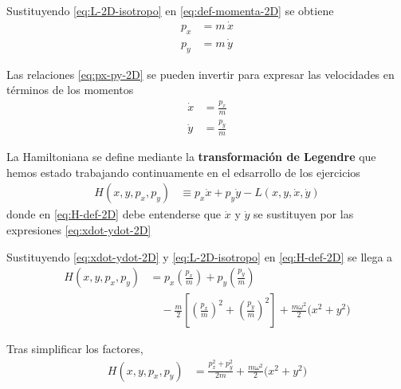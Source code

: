 \documentclass{article}
\begin{document}
Sustituyendo \eqref{eq:L-2D-isotropo} en \eqref{eq:def-momenta-2D} se obtiene
\begin{equation}
\begin{split}
p_{x} &= m\,\dot{x} \\[4pt]
p_{y} &= m\,\dot{y}
\end{split}
\label{eq:px-py-2D}
\end{equation}

Las relaciones \eqref{eq:px-py-2D} se pueden invertir para expresar las
velocidades en términos de los momentos
\begin{equation}
\begin{split}
\dot{x} &= \frac{p_{x}}{m} \\[4pt]
\dot{y} &= \frac{p_{y}}{m}
\end{split}
\label{eq:xdot-ydot-2D}
\end{equation}

La Hamiltoniana se define mediante la \textbf{transformación de Legendre} que hemos estado trabajando continuamente en el edsarrollo de los ejercicios
\begin{equation}
\begin{split}
H(x,y,p_{x},p_{y})
&\equiv p_{x}\dot{x} + p_{y}\dot{y} - L(x,y,\dot{x},\dot{y})
\end{split}
\label{eq:H-def-2D}
\end{equation}
donde en \eqref{eq:H-def-2D} debe entenderse que $\dot{x}$ y $\dot{y}$ se
sustituyen por las expresiones \eqref{eq:xdot-ydot-2D}

Sustituyendo \eqref{eq:xdot-ydot-2D} y \eqref{eq:L-2D-isotropo} en
\eqref{eq:H-def-2D} se llega a
\begin{equation}
\begin{split}
H(x,y,p_{x},p_{y})
&= p_{x}\left(\frac{p_{x}}{m}\right)
   + p_{y}\left(\frac{p_{y}}{m}\right) \\[4pt]
&\quad
   - \frac{m}{2}\left[
      \left(\frac{p_{x}}{m}\right)^{2}
      + \left(\frac{p_{y}}{m}\right)^{2}
     \right]
   + \frac{m\omega^{2}}{2}\bigl(x^{2}+y^{2}\bigr)
\end{split}
\label{eq:H-2D-paso-intermedio}
\end{equation}

Tras simplificar los factores,
\begin{equation}
\begin{split}
H(x,y,p_{x},p_{y})
&= \frac{p_{x}^{2}+p_{y}^{2}}{2m}
   + \frac{m\omega^{2}}{2}\bigl(x^{2}+y^{2}\bigr)
\end{split}
\label{eq:H-2D-oscilador}
\end{equation}
\end{document}
